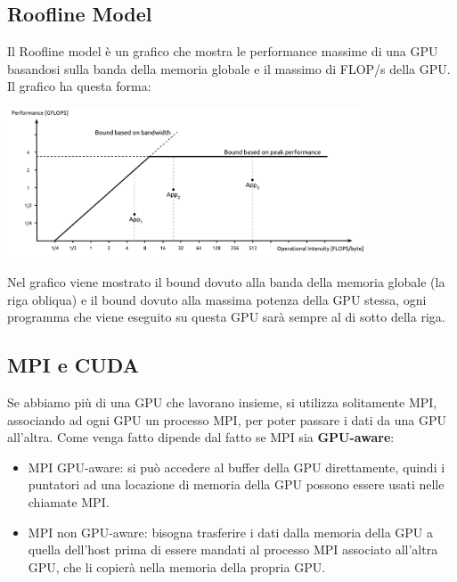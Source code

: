 \documentclass[10pt, letterpaper]{report}
\begin{document}
\subsection{Roofline Model}
Il Roofline model è un grafico che mostra le performance massime di una GPU basandosi
sulla banda della memoria globale e il massimo di FLOP/s della GPU. Il grafico ha questa
forma:
\begin{center}
    \includegraphics[width=0.8\textwidth ]{images/roofline.png}\end{center}
    Nel grafico viene mostrato il bound dovuto alla banda della memoria globale (la riga obliqua)
e il bound dovuto alla massima potenza della GPU stessa, ogni programma che viene eseguito
su questa GPU sarà sempre al di sotto della riga.
\subsection{MPI e CUDA}
Se abbiamo più di una GPU che lavorano insieme, si utilizza solitamente MPI, associando ad
ogni GPU un processo MPI, per poter passare i dati da una GPU all'altra. Come venga fatto
dipende dal fatto se MPI sia \textbf{GPU-aware}:\begin{itemize}
    \item MPI GPU-aware: si può accedere al buffer della GPU direttamente, quindi i puntatori
    ad una locazione di memoria della GPU possono essere usati nelle chiamate MPI.
    \item MPI non GPU-aware: bisogna trasferire i dati dalla memoria della GPU a quella dell'host
    prima di essere mandati al processo MPI associato all'altra GPU, che li copierà nella
    memoria della propria GPU.
\end{itemize}
\flowerLine 
\end{document}
